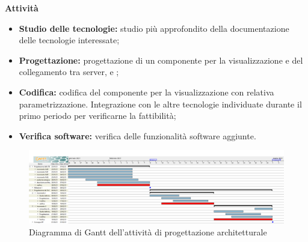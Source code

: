 \textbf{Attività}			

\begin{itemize}

\item \textbf{Studio delle tecnologie:} studio più approfondito della documentazione delle tecnologie interessate; %
\item \textbf{Progettazione:} progettazione di un componente per la visualizzazione  e del collegamento tra server,  e ;
\item \textbf{Codifica:} codifica del componente per la visualizzazione con relativa parametrizzazione. Integrazione con le altre tecnologie individuate durante il primo periodo per verificarne la fattibilità;
\item \textbf{Verifica software:} verifica delle funzionalità software aggiunte.
\end{itemize}

\begin{landscape}

\begin{figure}[h]
	\centering	
	\includegraphics[width=\linewidth]{Images/GanttPianificazioneProgettazioneArchitetturale.PNG}
	\caption{Diagramma di Gantt dell'attività di progettazione architetturale}
\end{figure}

\end{landscape}



